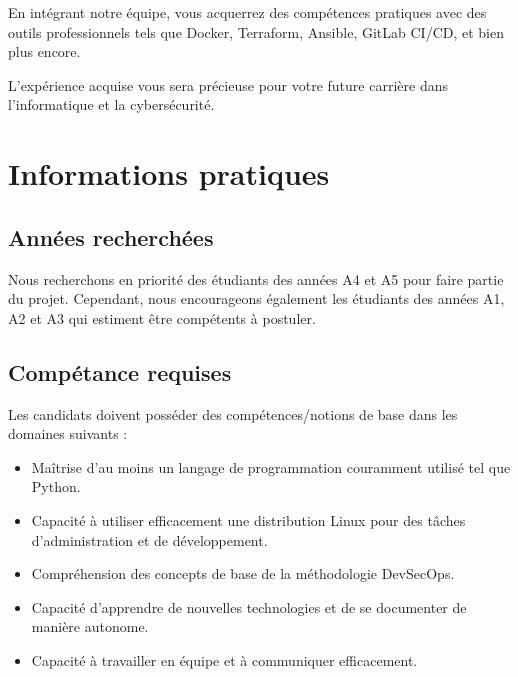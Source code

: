 \documentclass[12pt]{article}
\begin{document}
    \noindent En intégrant notre équipe, vous acquerrez des compétences pratiques avec des outils professionnels tels que Docker, Terraform, Ansible, GitLab CI/CD, et bien plus encore.
    
    \bigskip

    \noindent L'expérience acquise vous sera précieuse pour votre future carrière dans l'informatique et la cybersécurité.


	
    \section{Informations pratiques}
	\subsection{Années recherchées}
    Nous recherchons en priorité des étudiants des années A4 et A5 pour faire partie du projet. Cependant, nous encourageons également les étudiants des années A1, A2 et A3 qui estiment être compétents à postuler.
    \subsection{Compétance requises}
    Les candidats doivent posséder des compétences/notions de base dans les domaines suivants :
	\begin{itemize}
        \setlength\itemsep{0pt}
        \item Maîtrise d'au moins un langage de programmation couramment utilisé tel que Python.
        \item Capacité à utiliser efficacement une distribution Linux pour des tâches d'administration et de développement.
        \item Compréhension des concepts de base de la méthodologie DevSecOps.
        \item Capacité d'apprendre de nouvelles technologies et de se documenter de manière autonome.
        \item Capacité à travailler en équipe et à communiquer efficacement.
        
	\end{itemize}
	
\end{document}
